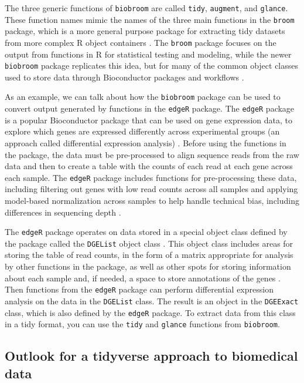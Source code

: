 \documentclass[]{tufte-book}
\begin{document}
The three generic functions of \texttt{biobroom} are called \texttt{tidy}, \texttt{augment},
and \texttt{glance}. These function names mimic the names of the three main functions
in the \texttt{broom} package, which is a more general purpose package for extracting
tidy datasets from more complex R object containers \citep{robinson2014broom}. The
\texttt{broom} package focuses on the output from functions in R for statistical
testing and modeling, while the newer \texttt{biobroom} package replicates this idea,
but for many of the common object classes used to store data through
Bioconductor packages and workflows \citep{biobroom}.

As an example, we can talk about how the \texttt{biobroom} package can be used to
convert output generated by functions in the \texttt{edgeR} package. The \texttt{edgeR}
package is a popular Bioconductor package that can be used on gene expression
data, to explore which genes are expressed differently across experimental
groups (an approach called differential expression analysis) \citep{edgeR}. Before
using the functions in the package, the data must be pre-processed to align
sequence reads from the raw data and then to create a table with the counts of
each read at each gene across each sample. The \texttt{edgeR} package includes
functions for pre-processing these data, including filtering out genes with low
read counts across all samples and applying model-based normalization across
samples to help handle technical bias, including differences in sequencing depth
\citep{chen2014edger}.

The \texttt{edgeR} package operates on data stored in a special object class defined by
the package called the \texttt{DGEList} object class \citep{chen2014edger}. This object
class includes areas for storing the table of read counts, in the form of a
matrix appropriate for analysis by other functions in the package, as well as
other spots for storing information about each sample and, if needed, a space to
store annotations of the genes \citep{chen2014edger}. Then functions from the \texttt{edgeR}
package can perform differential expression analysis on the data in the
\texttt{DGEList} class. The result is an object in the \texttt{DGEExact} class, which is also
defined by the \texttt{edgeR} package. To extract data from this class in a tidy
format, you can use the \texttt{tidy} and \texttt{glance} functions from \texttt{biobroom}.

\subsection{Outlook for a tidyverse approach to biomedical data}\label{outlook-for-a-tidyverse-approach-to-biomedical-data}
\end{document}
